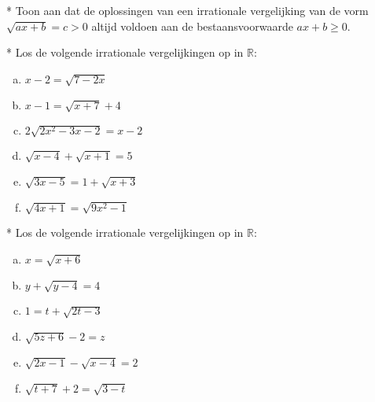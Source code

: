 \documentclass[12pt,twoside]{article}
\begin{document}
\begin{oefening}* Toon aan dat de oplossingen van een irrationale vergelijking van de vorm $\sqrt{ax+b}=c>0$ altijd voldoen aan de bestaansvoorwaarde $ax+b\geq0$.
\end{oefening}


\begin{oefening}*
Los de volgende irrationale vergelijkingen op in $\mathbb{R}$:
\begin{multicols}{2}
\begin{enumerate}[(a)]
  \item $x-2=\sqrt{7-2x}$
  \item $x-1=\sqrt{x+7}+4$
  \item $2\sqrt{2x^2-3x-2}=x-2$
  \item $\sqrt{x-4}+\sqrt{x+1}=5$
  \item $\sqrt{3x-5}=1+\sqrt{x+3}$
  \item $\sqrt{4x+1}=\sqrt{9x^2-1}$
\end{enumerate}
\end{multicols}
\end{oefening}

\begin{oefening}* %
Los de volgende irrationale vergelijkingen op in $\mathbb{R}$:
\begin{multicols}{2}
\begin{enumerate}[(a)]
  \item $x=\sqrt{x+6}$
  \item $y+\sqrt{y-4}=4$
  \item $1=t+\sqrt{2t-3}$
  \item $\sqrt{5z+6}-2=z$
  \item $\sqrt{2x-1}-\sqrt{x-4}=2$
  \item $\sqrt{t+7}+2=\sqrt{3-t}$
\end{enumerate}
\end{multicols}
\end{oefening}
\end{document}
